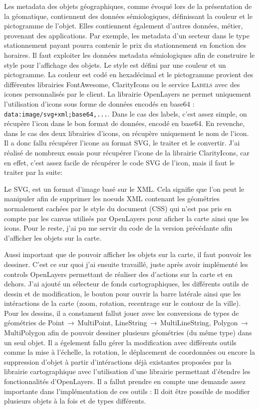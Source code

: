 \documentclass{rapportUHA40}
\begin{document}
Les metadata des objets géographiques, comme évoqué lors de la présentation de
la géomatique, contiennent des données sémiologiques, définissant la couleur et
le pictogramme de l'objet. Elles contiennent également d'autres données,
métier, provenant des applications. Par exemple, les metadata d'un secteur dans
le type stationnement payant pourra contenir le prix du stationnement en
fonction des horaires. Il faut exploiter les données metadata sémiologiques
afin de construire le style pour l'affichage des objets. Le style est défini
par une couleur et un pictogramme. La couleur est codé en hexadécimal et le
pictogramme provient des différentes librairies FontAwesome, ClarityIcons ou le
service \textsc{Labels} avec des icones personnalisés par le client. La
librairie OpenLayers ne permet uniquement l'utilisation d'icons sous forme de
données encodés en base64 : \texttt{data:image/svg+xml;base64,...}.
Dans le cas des labels, c'est assez simple, on récupère l'icon dans le bon
format de données, encodé en base64. En revenche, dans le cas des deux
librairies d'icons, on récupère uniquement le nom de l'icon. Il a donc fallu
récupérer l'icone au format SVG, le traiter et le convertir. J'ai réalisé de
nombreux essais pour récupérer l'icone de la librairie ClarityIcons, car en
effet, c'est assez facile de récupérer le code SVG de l'icon, mais il faut le
traiter par la suite: 

Le SVG, est un format d'image basé sur le XML. Cela signifie que l'on peut le
manipuler afin de supprimer les noeuds XML contenant les géométries normalement
cachées par le style du document (CSS) qui n'est pas pris en compte par les
canvas utilisés par OpenLayers pour aficher la carte ainsi que les icons. Pour
le reste, j'ai pu me servir du code de la version précédante afin d'afficher
les objets sur la carte.

Aussi important que de pouvoir afficher les objets sur la carte, il faut
pouvoir les dessiner. C'est ce sur quoi j'ai ensuite travaillé, juste après
avoir implémenté les controls OpenLayers permettant de réaliser des d'actions
sur la carte et en dehors. J'ai ajouté un sélecteur de fonds cartographiques,
les différents outils de dessin et de modification, le bouton pour ouvrir la
barre latérale ainsi que les intéractions de la carte (zoom, rotation,
recentrage sur le contour de la ville). Pour les dessins, il a constament
fallut jouer avec les conversions de types de géométries de
Point$\,\to\,$MultiPoint, LineString$\,\to\,$MultiLineString,
Polygon$\,\to\,$MultiPolygon afin de pouvoir dessiner plusieurs géométries (du
même type) dans un seul objet. Il a égelement fallu gérer la modification avec
différents outils comme la mise à l'échelle, la rotation, le déplacement de
coordonnées ou encore la suppression d'objet à partir d'intéractions déjà
existantes proposées par la librairie cartographique avec l'utilisation d'une
librairie permettant d'étendre les fonctionnalités d'OpenLayers. Il a fallut
prendre en compte une demande assez importante dans l'implémentation de ces
outils : Il doit être possible de modifier plusieurs objets à la fois et de
types différents.
\end{document}
